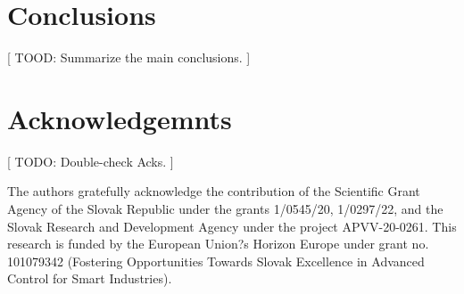 \documentclass[letterpaper, 10 pt, conference]{ieeeconf}
\begin{document}
\section{Conclusions}
\label{sec:conclusions}

[ TOOD: Summarize the main conclusions. ]

\addtolength{\textheight}{-12cm}

\section*{Acknowledgemnts}

[ TODO: Double-check Acks. ]

The authors gratefully acknowledge the contribution of the Scientific Grant Agency of the Slovak Republic under the grants 1/0545/20, 1/0297/22, and the Slovak Research and Development Agency under the project APVV-20-0261. This research is funded by the European Union?s Horizon Europe under grant no. 101079342 (Fostering Opportunities Towards Slovak Excellence in Advanced Control for Smart Industries).



\end{document}
